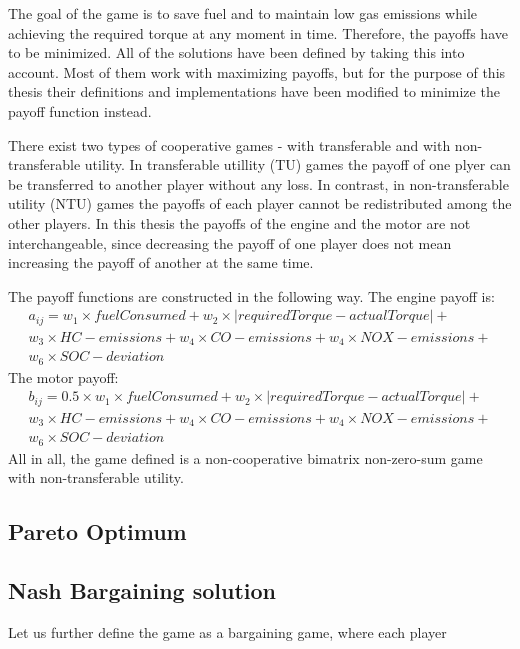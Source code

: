The goal of the game is to save fuel and to maintain low gas emissions while achieving the required torque at any moment in time. Therefore, the payoffs have to be minimized. All of the solutions have been defined by taking this into account. Most of them work with maximizing payoffs, but for the purpose of this thesis their definitions and implementations have been modified to minimize the payoff function instead. 


There exist two types of cooperative games - with transferable and with non-transferable utility. In transferable utillity (TU) games the payoff of one plyer can be transferred to another player without any loss. In contrast, in non-transferable utility (NTU) games the payoffs of each player cannot be redistributed among the other players. In this thesis the payoffs of the engine and the motor are not interchangeable, since decreasing the payoff of one player does not mean increasing the payoff of another at the same time.

The payoff functions are constructed in the following way. The engine payoff is:
\begin{equation}
\begin{split}
a_{ij} = w_1 \times fuelConsumed + w_2 \times | requiredTorque - actualTorque | + \\
w_3 \times HC-emissions + w_4 \times CO-emissions + w_4 \times NOX-emissions + \\
w_6 \times SOC-deviation
\end{split}
\end{equation}
The motor payoff:
\begin{equation}
\begin{split}
b_{ij} = 0.5 \times w_1 \times fuelConsumed + w_2 \times | requiredTorque - actualTorque | + \\
w_3 \times HC-emissions + w_4 \times CO-emissions + w_4 \times NOX-emissions + \\
w_6 \times SOC-deviation
\end{split}
\end{equation}
All in all, the game defined is a non-cooperative bimatrix non-zero-sum game with non-transferable utility.

\subsection{Pareto Optimum}

\subsection{Nash Bargaining solution}
Let us further define the game as a bargaining game, where each player 


